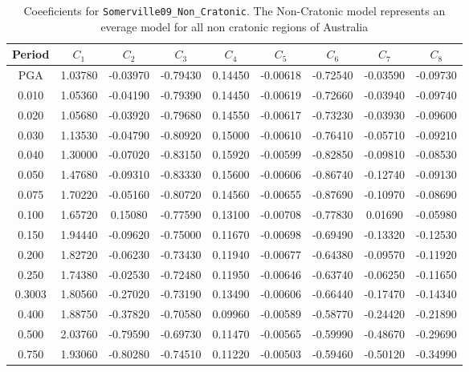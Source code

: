 \begin{table}
\caption{Coeeficients for \texttt{Somerville09\_Non\_Cratonic}. The
Non-Cratonic model represents an everage model for all non cratonic
regions of Australia } \label{tab:Coeff-Somerville09_Non_Cratonic}
\footnotesize
\begin{tabular}{ccccccccc}
 \hline
Period  & $C_1$    & $C_2$     & $C_3$     & $C_4$     & $C_5$    & $C_6$    & $C_7$    & $C_8$ \\
\hline
PGA     & 1.03780  & -0.03970  & -0.79430  & 0.14450   & -0.00618 & -0.72540 & -0.03590 & -0.09730 \\
0.010   & 1.05360  & -0.04190  & -0.79390  & 0.14450   & -0.00619 & -0.72660 & -0.03940 & -0.09740 \\
0.020   & 1.05680  & -0.03920  & -0.79680  & 0.14550   & -0.00617 & -0.73230 & -0.03930 & -0.09600 \\
0.030   & 1.13530  & -0.04790  & -0.80920  & 0.15000   & -0.00610 & -0.76410 & -0.05710 & -0.09210 \\
0.040   & 1.30000  & -0.07020  & -0.83150  & 0.15920   & -0.00599 & -0.82850 & -0.09810 & -0.08530 \\
0.050   & 1.47680  & -0.09310  & -0.83330  & 0.15600   & -0.00606 & -0.86740 & -0.12740 & -0.09130 \\
0.075   & 1.70220  & -0.05160  & -0.80720  & 0.14560   & -0.00655 & -0.87690 & -0.10970 & -0.08690 \\
0.100   & 1.65720  & 0.15080   & -0.77590  & 0.13100   & -0.00708 & -0.77830 & 0.01690  & -0.05980 \\
0.150   & 1.94440  & -0.09620  & -0.75000  & 0.11670   & -0.00698 & -0.69490 & -0.13320 & -0.12530 \\
0.200   & 1.82720  & -0.06230  & -0.73430  & 0.11940   & -0.00677 & -0.64380 & -0.09570 & -0.11920 \\
0.250   & 1.74380  & -0.02530  & -0.72480  & 0.11950   & -0.00646 & -0.63740 & -0.06250 & -0.11650 \\
0.3003  & 1.80560  & -0.27020  & -0.73190  & 0.13490   & -0.00606 & -0.66440 & -0.17470 & -0.14340 \\
0.400   & 1.88750  & -0.37820  & -0.70580  & 0.09960   & -0.00589 & -0.58770 & -0.24420 & -0.21890 \\
0.500   & 2.03760  & -0.79590  & -0.69730  & 0.11470   & -0.00565 & -0.59990 & -0.48670 & -0.29690 \\
0.750   & 1.93060  & -0.80280  & -0.74510  & 0.11220   & -0.00503 & -0.59460 & -0.50120 & -0.34990 \\

\end{tabular}
\end{table}
